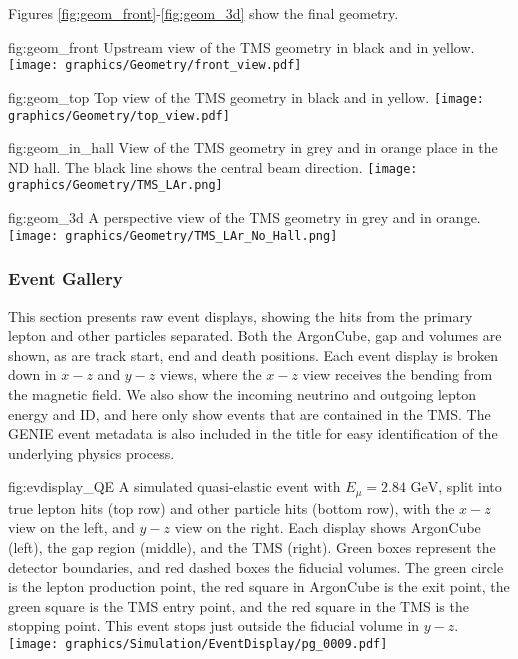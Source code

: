 Figures \ref{fig:geom_front}-\ref{fig:geom_3d} show the final geometry.

\begin{dunefigure}[]{fig:geom_front}
{Upstream view of the TMS geometry in black and  in yellow.}
\texttt{[image: graphics/Geometry/front\_view.pdf]}
\end{dunefigure}
\begin{dunefigure}[]{fig:geom_top}
{Top view of the TMS geometry in black and  in yellow.}
\texttt{[image: graphics/Geometry/top\_view.pdf]}
\end{dunefigure}
\begin{dunefigure}[]{fig:geom_in_hall}
{View of the TMS geometry in grey and  in orange place in the ND hall. The black line shows the central beam direction. }
\texttt{[image: graphics/Geometry/TMS\_LAr.png]}
\end{dunefigure}
\begin{dunefigure}[]{fig:geom_3d}
{A perspective view of the TMS geometry in grey and  in orange.}
\texttt{[image: graphics/Geometry/TMS\_LAr\_No\_Hall.png]}
\end{dunefigure}

\subsubsection{Event Gallery}
This section presents raw event displays, showing the hits from the primary lepton and other particles separated. Both the ArgonCube, gap and  volumes are shown, as are track start, end and death positions. Each event display is broken down in $x-z$ and $y-z$ views, where the $x-z$ view receives the bending from the magnetic field. We also show the incoming neutrino and outgoing lepton energy and ID, and here only show events that are contained in the TMS. The GENIE event metadata is also included in the title for easy identification of the underlying physics process.

\begin{dunefigure}[]{fig:evdisplay_QE}
{A simulated quasi-elastic event with $E_\mu=2.84\text{ GeV}$, split into true lepton hits (top row) and other particle hits (bottom row), with the $x-z$ view on the left, and $y-z$ view on the right. Each display shows ArgonCube (left), the gap region (middle), and the TMS (right). Green boxes represent the detector boundaries, and red dashed boxes the fiducial volumes. The green circle is the lepton production point, the red square in ArgonCube is the exit point, the green square is the TMS entry point, and the red square in the TMS is the stopping point. This event stops just outside the fiducial volume in $y-z$.}
\texttt{[image: graphics/Simulation/EventDisplay/pg\_0009.pdf]}
\end{dunefigure}

